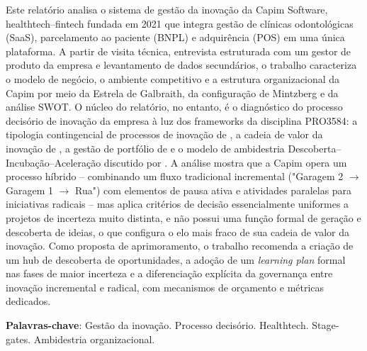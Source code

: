 \begin{resumo}
\noindent Este relatório analisa o sistema de gestão da inovação da Capim Software, healthtech--fintech fundada em 2021 que integra gestão de clínicas odontológicas (SaaS), parcelamento ao paciente (BNPL) e adquirência (POS) em uma única plataforma. A partir de visita técnica, entrevista estruturada com um gestor de produto da empresa e levantamento de dados secundários, o trabalho caracteriza o modelo de negócio, o ambiente competitivo e a estrutura organizacional da Capim por meio da Estrela de Galbraith, da configuração de Mintzberg e da análise SWOT. O núcleo do relatório, no entanto, é o diagnóstico do processo decisório de inovação da empresa à luz dos frameworks da disciplina PRO3584: a tipologia contingencial de processos de inovação de \textcite{salerno2015}, a cadeia de valor da inovação de \textcite{hansenbirkinshaw2007}, a gestão de portfólio de \textcite{goffinmitchell2010} e o modelo de ambidestria Descoberta--Incubação--Aceleração discutido por \textcite{salernogomes2018}. A análise mostra que a Capim opera um processo híbrido -- combinando um fluxo tradicional incremental ("Garagem 2 $\rightarrow$ Garagem 1 $\rightarrow$ Rua") com elementos de pausa ativa e atividades paralelas para iniciativas radicais -- mas aplica critérios de decisão essencialmente uniformes a projetos de incerteza muito distinta, e não possui uma função formal de geração e descoberta de ideias, o que configura o elo mais fraco de sua cadeia de valor da inovação. Como proposta de aprimoramento, o trabalho recomenda a criação de um hub de descoberta de oportunidades, a adoção de um \textit{learning plan} formal nas fases de maior incerteza e a diferenciação explícita da governança entre inovação incremental e radical, com mecanismos de orçamento e métricas dedicados.

\vspace{\onelineskip}
\noindent\textbf{Palavras-chave}: Gestão da inovação. Processo decisório. Healthtech. Stage-gates. Ambidestria organizacional.
\end{resumo}
